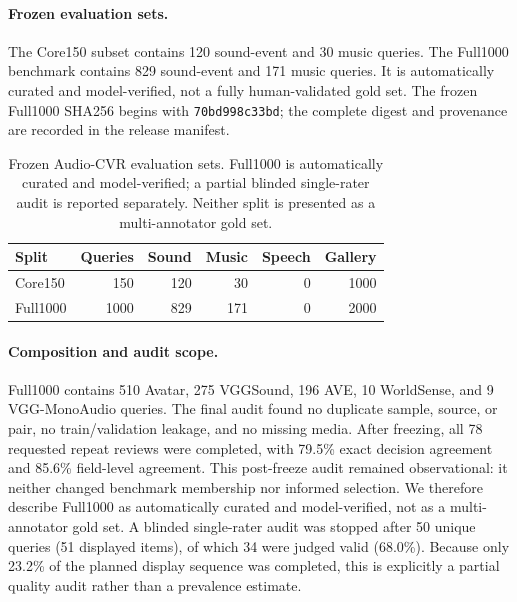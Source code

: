 \documentclass[letterpaper]{article}
\begin{document}
\paragraph{Frozen evaluation sets.}
The Core150 subset contains 120 sound-event and 30 music queries.
The Full1000 benchmark contains 829 sound-event and 171 music queries.
It is automatically curated and model-verified, not a fully human-validated gold set.
The frozen Full1000 SHA256 begins with \texttt{70bd998c33bd}; the complete
digest and provenance are recorded in the release manifest.

\begin{table}[t]
\centering
\small
\setlength{\tabcolsep}{3.2pt}
\caption{Frozen Audio-CVR evaluation sets. Full1000 is automatically curated and model-verified; a partial blinded single-rater audit is reported separately. Neither split is presented as a multi-annotator gold set.}
\label{tab:benchmark}
\begin{tabular}{lrrrrr}
\toprule
Split & Queries & Sound & Music & Speech & Gallery \\
\midrule
Core150 & 150 & 120 & 30 & 0 & 1000 \\
Full1000 & 1000 & 829 & 171 & 0 & 2000 \\
\bottomrule
\end{tabular}
\end{table}

\paragraph{Composition and audit scope.}
Full1000 contains 510 Avatar, 275 VGGSound, 196 AVE, 10 WorldSense, and 9 VGG-MonoAudio queries. The final audit found no duplicate sample, source, or pair, no train/validation leakage, and no missing media. After freezing, all 78 requested repeat reviews were completed, with 79.5\% exact decision agreement and 85.6\% field-level agreement. This post-freeze audit remained observational: it neither changed benchmark membership nor informed selection. We therefore describe Full1000 as automatically curated and model-verified, not as a multi-annotator gold set. A blinded single-rater audit was stopped after 50 unique queries (51 displayed items), of which 34 were judged valid (68.0\%). Because only 23.2\% of the planned display sequence was completed, this is explicitly a partial quality audit rather than a prevalence estimate.
\end{document}
